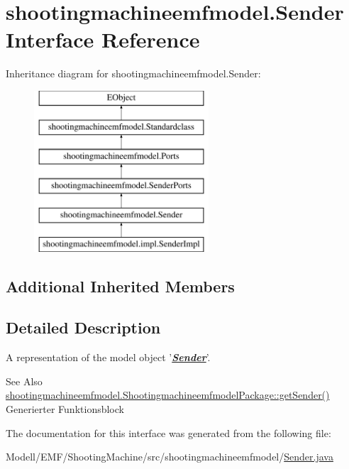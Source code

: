 \hypertarget{interfaceshootingmachineemfmodel_1_1_sender}{\section{shootingmachineemfmodel.\-Sender Interface Reference}
\label{interfaceshootingmachineemfmodel_1_1_sender}
}
Inheritance diagram for shootingmachineemfmodel.\-Sender\-:\begin{figure}[H]
\begin{center}
\leavevmode
\includegraphics[height=6.000000cm]{interfaceshootingmachineemfmodel_1_1_sender}
\end{center}
\end{figure}
\subsection*{Additional Inherited Members}


\subsection{Detailed Description}
A representation of the model object '{\itshape {\bfseries \hyperlink{interfaceshootingmachineemfmodel_1_1_sender}{Sender}}}'.

\begin{DoxySeeAlso}{See Also}
\hyperlink{interfaceshootingmachineemfmodel_1_1_shootingmachineemfmodel_package_a2a69949be5640c789c4f18ac4113f876}{shootingmachineemfmodel.\-Shootingmachineemfmodel\-Package\-::get\-Sender()}  Generierter Funktionsblock 
\end{DoxySeeAlso}


The documentation for this interface was generated from the following file\-:\begin{DoxyCompactItemize}
\item 
Modell/\-E\-M\-F/\-Shooting\-Machine/src/shootingmachineemfmodel/\hyperlink{_sender_8java}{Sender.\-java}\end{DoxyCompactItemize}

